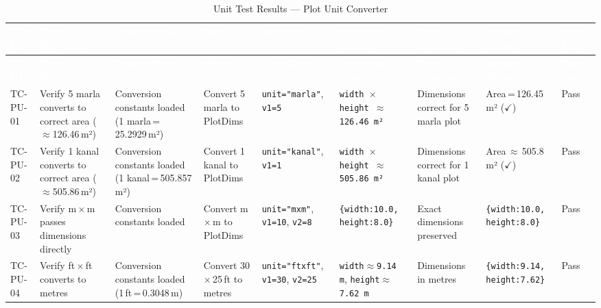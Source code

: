 \begin{landscape}
\small
\begin{longtable}{|p{1.4cm}|p{3.2cm}|p{2.8cm}|p{2.8cm}|p{2.8cm}|p{2.8cm}|p{2.6cm}|p{2.8cm}|p{1.0cm}|}
\caption{Unit Test Results — Plot Unit Converter} \label{tab:pu} \\
\hline
\rowcolor{tableheader}
\textcolor{white}{\textbf{TC ID}} &
\textcolor{white}{\textbf{Test Objective}} &
\textcolor{white}{\textbf{Precondition}} &
\textcolor{white}{\textbf{Steps}} &
\textcolor{white}{\textbf{Test Data}} &
\textcolor{white}{\textbf{Expected Result}} &
\textcolor{white}{\textbf{Post-condition}} &
\textcolor{white}{\textbf{Actual Result}} &
\textcolor{white}{\textbf{Pass/ Fail}} \\
\hline
\endfirsthead
\hline
\rowcolor{tableheader}
\textcolor{white}{\textbf{TC ID}} &
\textcolor{white}{\textbf{Test Objective}} &
\textcolor{white}{\textbf{Precondition}} &
\textcolor{white}{\textbf{Steps}} &
\textcolor{white}{\textbf{Test Data}} &
\textcolor{white}{\textbf{Expected Result}} &
\textcolor{white}{\textbf{Post-condition}} &
\textcolor{white}{\textbf{Actual Result}} &
\textcolor{white}{\textbf{Pass/ Fail}} \\
\hline
\endhead

\rowcolor{passgreen}
TC-PU-01 & Verify 5 marla converts to correct area ($\approx$126.46\,m²) & Conversion constants loaded (1 marla\,=\,25.2929\,m²) & Convert 5 marla to PlotDims & \texttt{unit="marla"}, \texttt{v1=5} & \texttt{width $\times$ height $\approx$ 126.46\,m²} & Dimensions correct for 5 marla plot & Area\,=\,126.45\,m² ($\checkmark$) & Pass \\ \hline

\rowcolor{passgreen}
TC-PU-02 & Verify 1 kanal converts to correct area ($\approx$505.86\,m²) & Conversion constants loaded (1 kanal\,=\,505.857\,m²) & Convert 1 kanal to PlotDims & \texttt{unit="kanal"}, \texttt{v1=1} & \texttt{width $\times$ height $\approx$ 505.86\,m²} & Dimensions correct for 1 kanal plot & Area\,$\approx$\,505.8\,m² ($\checkmark$) & Pass \\ \hline

\rowcolor{passgreen}
TC-PU-03 & Verify m\,$\times$\,m passes dimensions directly & Conversion constants loaded & Convert m\,$\times$\,m to PlotDims & \texttt{unit="mxm"}, \texttt{v1=10}, \texttt{v2=8} & \texttt{\{width:10.0, height:8.0\}} & Exact dimensions preserved & \texttt{\{width:10.0, height:8.0\}} & Pass \\ \hline

\rowcolor{passgreen}
TC-PU-04 & Verify ft\,$\times$\,ft converts to metres & Conversion constants loaded (1\,ft\,=\,0.3048\,m) & Convert 30\,$\times$\,25\,ft to metres & \texttt{unit="ftxft"}, \texttt{v1=30}, \texttt{v2=25} & \texttt{width$\approx$9.14\,m}, \texttt{height$\approx$7.62\,m} & Dimensions in metres & \texttt{\{width:9.14, height:7.62\}} & Pass \\ \hline


\end{longtable}
\end{landscape}
